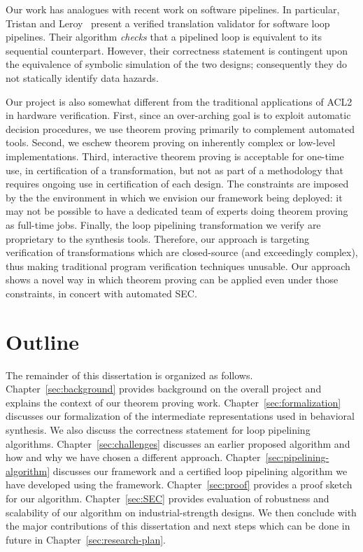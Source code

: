 Our work has analogues with recent work on software
pipelines.  In particular, Tristan and
Leroy~\cite{tl:software-popl10} present a verified
translation validator for software loop pipelines. Their
algorithm {\em checks} that a pipelined loop is equivalent
to its sequential counterpart.  However, their correctness
statement is contingent upon the equivalence of symbolic
simulation of the two designs; consequently they do not
statically identify data hazards.

Our project is also somewhat different from the
traditional applications of ACL2 in hardware verification.
First, since an over-arching goal is to exploit automatic
decision procedures, we use theorem proving primarily to
complement automated tools.  Second, we eschew theorem
proving on inherently complex or low-level implementations.
Third, interactive theorem proving is acceptable for
one-time use, %
 in certification of a transformation, but not as part of a methodology that
requires ongoing use in certification of each design.  The
constraints are imposed by the the environment in which we
envision our framework being deployed: it may not be
possible to have a dedicated team of experts doing theorem
proving as full-time jobs.  Finally, the loop pipelining transformation
we verify are proprietary to the synthesis tools. Therefore, our approach is
targeting verification of transformations
which are closed-source (and exceedingly complex), thus
making traditional program verification techniques unusable.
Our approach shows a novel way in which theorem
proving can be applied even under those constraints, in
concert with automated SEC.

\section {Outline}
The remainder of this dissertation is organized as
follows. Chapter~\ref{sec:background} provides background on the overall project and explains the context
of our theorem proving work. Chapter~\ref{sec:formalization}
discusses our formalization of the intermediate representations used in behavioral synthesis.
We also discuss the correctness statement for loop pipelining algorithms.
Chapter~\ref{sec:challenges} discusses an earlier proposed
algorithm and how and why we have chosen a different approach.
Chapter~\ref{sec:pipelining-algorithm} discusses our
framework and a certified loop pipelining algorithm we have developed using the framework. Chapter~\ref{sec:proof} provides a proof sketch for our algorithm. Chapter~\ref{sec:SEC} provides evaluation of robustness and scalability of our algorithm on
industrial-strength designs. We then conclude with the major contributions of this dissertation and next steps which can be done in future in Chapter~\ref{sec:research-plan}.
